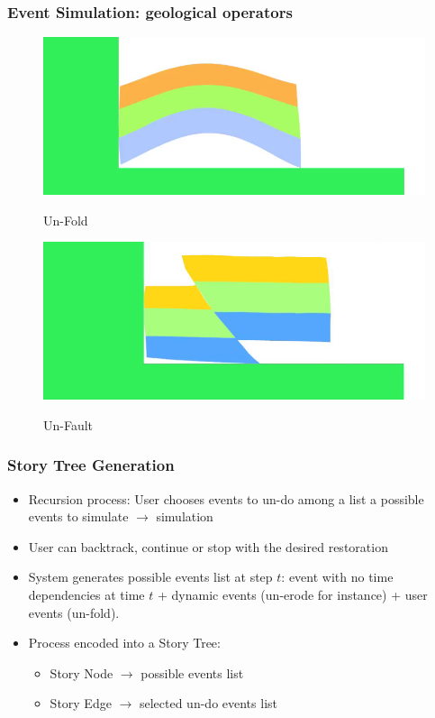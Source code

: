 \documentclass{beamer}
\begin{document}
	\begin{frame}
	\frametitle{Event Simulation:  geological operators}
	\begin{figure}[H]
	\centering
	\href{un-fold.flv}{\includegraphics[scale=0.2]{unFoldVid.png}}
	\caption{Un-Fold}
	\end{figure}
	\begin{figure}[H]
	\centering
	\href{un-Fault.flv}{\includegraphics[scale=0.2]{unFaultVid.png}}
	\caption{Un-Fault}
	\end{figure}
	\end{frame}
	
	

	\begin{frame}
	\frametitle{Story Tree Generation}
	\begin{itemize}
	\item Recursion process: User chooses events to un-do among a list a possible events to simulate $\longrightarrow$ simulation
	\item User can backtrack, continue or stop with the desired restoration
	\item System generates possible events list at step $t$: event with no time dependencies at time $t$ + dynamic events (un-erode for instance) + user events (un-fold).
	\item Process encoded into a Story Tree:
	\begin{itemize}
	\item Story Node $\longrightarrow$ possible events list
	\item Story Edge $\longrightarrow$ selected un-do events  list
	\end{itemize}

	\end{itemize}
	\end{frame}
	
\end{document}
